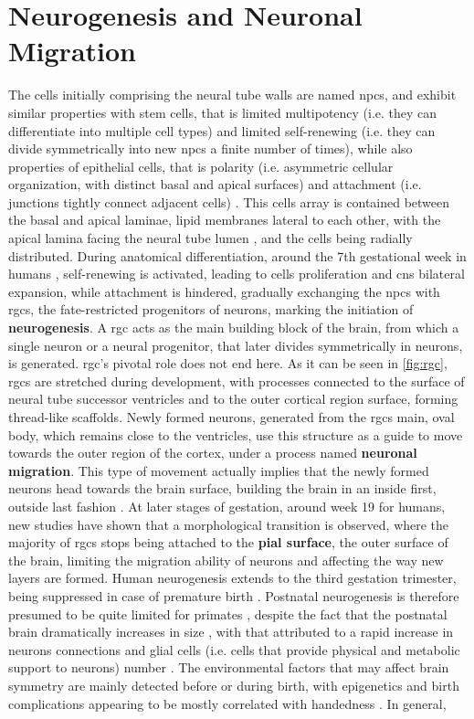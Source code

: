 \section{Neurogenesis and Neuronal Migration}
The cells initially comprising the neural tube walls are named \acfp{npc}, and exhibit similar properties with stem cells, that is limited multipotency (i.e. they can differentiate into multiple cell types) and limited self-renewing (i.e. they can divide symmetrically into new \acsp{npc} a finite number of times), while also properties of epithelial cells, that is polarity (i.e. asymmetric cellular organization, with distinct basal and apical surfaces)  and attachment (i.e. junctions tightly connect adjacent cells) \cite{Gotz2005}. This cells array is contained between the basal and apical laminae, lipid membranes lateral to each other, with the apical lamina facing the neural tube lumen \cite{Aaku-Saraste1997}, and the cells being radially distributed. During anatomical differentiation, around the 7th gestational week in humans \cite{Nowakowski2016}, self-renewing is activated, leading to cells proliferation and \ac{cns} bilateral expansion, while attachment is hindered, gradually exchanging the \acsp{npc} with \acsp{rgc}, the fate-restricted progenitors of neurons, marking the initiation of \textbf{neurogenesis}\cite{Gotz2005}. A \ac{rgc} acts as the main building block of the brain, from which a single neuron or a neural progenitor, that later divides symmetrically in neurons, is generated. \Acs{rgc}'s pivotal role does not end here. As it can be seen in \autoref{fig:rgc}, \acsp{rgc} are stretched during development, with processes connected to the surface of neural tube successor ventricles and to the outer cortical region surface, forming thread-like scaffolds. Newly formed neurons, generated from the \acsp{rgc} main, oval body, which remains close to the ventricles, use this structure as a guide to move towards the outer region of the cortex, under a process named \textbf{neuronal migration}\cite{Rakic2009}. This type of movement actually implies that the newly formed neurons head towards the brain surface, building the brain in an inside first, outside last fashion \cite{Molnar2019}. At later stages of gestation, around week 19 for humans, new studies have shown that a morphological transition is observed, where the majority of \acp{rgc} stops being attached to the \textbf{pial surface}, the outer surface of the brain, limiting the migration ability of neurons  \cite{Nowakowski2016} and affecting the way new layers are formed. Human neurogenesis extends to the third gestation trimester, being suppressed in case of premature birth \cite{Malik2013}. Postnatal neurogenesis is therefore presumed to be quite limited for primates \cite{Ernst2015}, despite the fact that the postnatal brain  dramatically increases in size , with that attributed to a rapid increase in neurons connections and glial cells (i.e. cells that provide physical and metabolic support to neurons) number \cite{Dyck2017}. The environmental factors that may affect brain symmetry are mainly detected before or during birth, with epigenetics and birth complications  appearing to be mostly correlated with handedness \cite{Schmitz2019,Cara2022}. In general, 